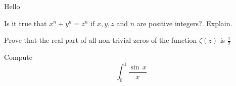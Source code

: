 \documentclass[12pt]{exam}
\begin{document}
Hello\\

\begin{questions}
\question[3] Is it true that \(x^n + y^n = z^n\) if \(x,y,z\) and \(n\) are
positive integers?. Explain.
 
\question[4] Prove that the real part of all non-trivial zeros of the function
\(\zeta(z)\) is \(\frac{1}{2}\)
 
\question[4] Compute \[\int_{0}^{1} \frac{\sin\,x}{x}\]
\end{questions}
\end{document}
